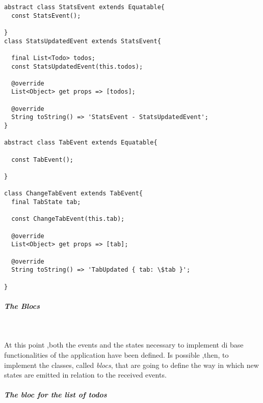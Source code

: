 \begin{code}
\mbox{}\\
 \mbox{}
\label{code:2.14}
\begin{verbatim}


abstract class StatsEvent extends Equatable{
  const StatsEvent();

}
class StatsUpdatedEvent extends StatsEvent{

  final List<Todo> todos;
  const StatsUpdatedEvent(this.todos);

  @override
  List<Object> get props => [todos];

  @override
  String toString() => 'StatsEvent - StatsUpdatedEvent';
}

abstract class TabEvent extends Equatable{

  const TabEvent();

}

class ChangeTabEvent extends TabEvent{
  final TabState tab;

  const ChangeTabEvent(this.tab);

  @override
  List<Object> get props => [tab];

  @override
  String toString() => 'TabUpdated { tab: \$tab }';

}
\end{verbatim}
\mbox{}
\end{code}

\subparagraph{The Blocs}\mbox{}\\
\label{subpar:todo_app_bloc_core_state}

At this point ,both the events and the states necessary to implement di base functionalities of the application have been defined. Is possible ,then, to implement the classes, called \textit{blocs}, that are going to define the way in which new states are emitted in relation to the received events.

\subparagraph{The bloc for the list of todos}\mbox{}\\
\label{subpar:todo_app_bloc_core_state}

